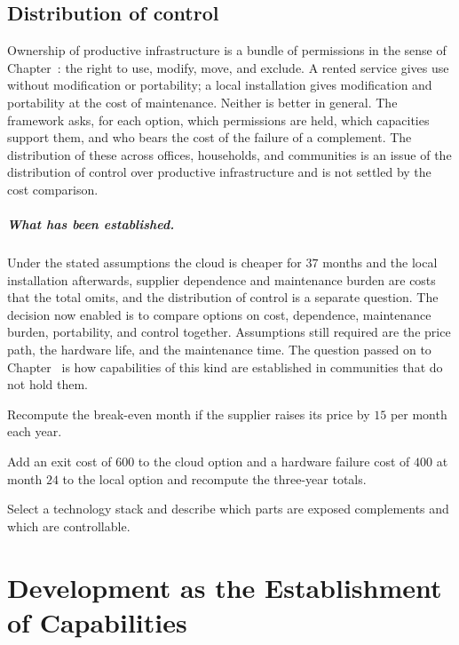 \section{Distribution of control}

Ownership of productive infrastructure is a bundle of permissions in the sense of Chapter~: the right to use, modify, move, and exclude. A rented service gives use without modification or portability; a local installation gives modification and portability at the cost of maintenance. Neither is better in general. The framework asks, for each option, which permissions are held, which capacities support them, and who bears the cost of the failure of a complement. The distribution of these across offices, households, and communities is an issue of the distribution of control over productive infrastructure and is not settled by the cost comparison.

\paragraph{What has been established.} Under the stated assumptions the cloud is cheaper for $37$ months and the local installation afterwards, supplier dependence and maintenance burden are costs that the total omits, and the distribution of control is a separate question. The decision now enabled is to compare options on cost, dependence, maintenance burden, portability, and control together. Assumptions still required are the price path, the hardware life, and the maintenance time. The question passed on to Chapter~ is how capabilities of this kind are established in communities that do not hold them.

\begin{exercise}
Recompute the break-even month if the supplier raises its price by $15$ per month each year.
\end{exercise}
\begin{exercise}
Add an exit cost of $600$ to the cloud option and a hardware failure cost of $400$ at month $24$ to the local option and recompute the three-year totals.
\end{exercise}
\begin{exercise}
Select a technology stack and describe which parts are exposed complements and which are controllable.
\end{exercise}

\chapter{Development as the Establishment of Capabilities}\label{ch:39}

